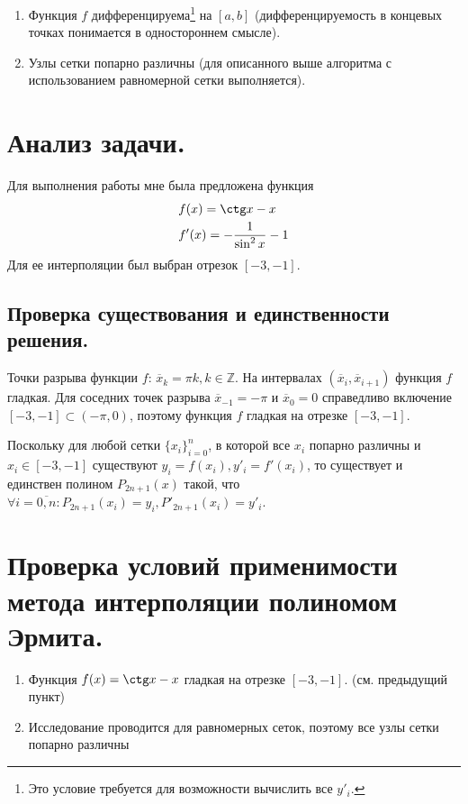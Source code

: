 \documentclass[a4paper, 12pt]{article}
\begin{document}
	\begin{enumerate}
		\item Функция $f$ дифференцируема\footnote{Это условие требуется для возможности вычислить все $y'_i$.} на $[a,b]$ (дифференцируемость в концевых точках понимается в одностороннем смысле).
		\item Узлы сетки попарно различны (для описанного выше алгоритма с использованием равномерной сетки выполняется).
	\end{enumerate}

	\section{Анализ задачи.}
	
	Для выполнения работы мне была предложена функция
	\begin{equation}
		\begin{aligned}
				&f(x)=\ctg x - x\\
			&f'(x)=-\frac{1}{\sin^2x}-1
		\end{aligned}
	\end{equation}
	Для ее интерполяции был выбран отрезок $[-3,-1]$.
	
	\subsection{Проверка существования и единственности решения.}
	
	Точки разрыва функции $f$: $\overline{x}_k=\pi k,k\in\mathbb{Z}$. На интервалах $(\overline{x}_{i}, \overline{x}_{i+1})$ функция $f$ гладкая. Для соседних точек разрыва $\overline{x}_{-1}=-\pi$ и $\overline{x}_{0}=0$ справедливо включение $[-3,-1]\subset(-\pi,0)$, поэтому функция $f$ гладкая на отрезке $[-3,-1]$.
	
	Поскольку для любой сетки $\{x_i\}_{i=0}^n$, в которой все $x_i$ попарно различны и $x_i\in[-3,-1]$ существуют $y_i=f(x_i), y'_i=f'(x_i)$, то существует и единствен полином $P_{2n+1}(x)$ такой, что $\forall i=\overline{0,n} : P_{2n+1}(x_i)=y_i, P'_{2n+1}(x_i) =y'_i$.
	
	\section{Проверка условий применимости метода интерполяции полиномом Эрмита.}
	
	\begin{enumerate}
		\item Функция $f(x)=\ctg x - x$ гладкая на отрезке $[-3,-1]$. (см. предыдущий пункт)
		\item Исследование проводится для равномерных сеток, поэтому все узлы сетки попарно различны
	\end{enumerate}
	
\end{document}
